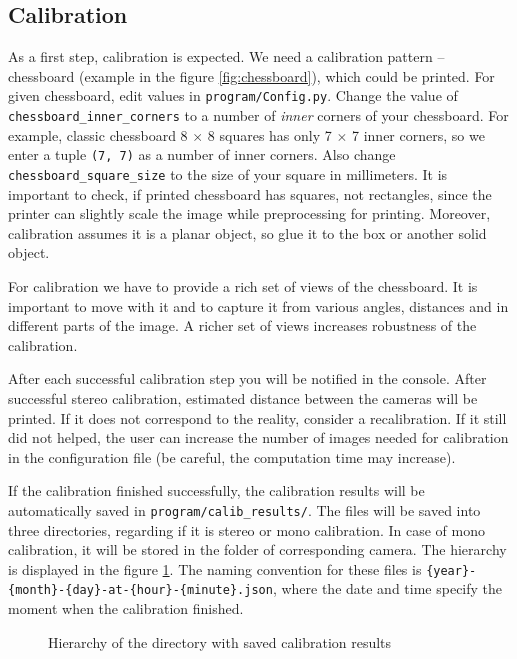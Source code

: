 \subsection{Calibration}
As a first step, calibration is expected. We need a calibration pattern --
chessboard (example in the figure \ref{fig:chessboard}), which could be
printed. For given chessboard, edit values in \verb+program/Config.py+. Change
the value of \verb+chessboard_inner_corners+ to a number of \emph{inner}
corners of your chessboard. For example, classic chessboard 8 $\times$ 8
squares has only 7 $\times$ 7 inner corners, so we enter a tuple \verb+(7, 7)+
as a number of inner corners. Also change \verb+chessboard_square_size+ to the
size of your square in millimeters. It is important to check, if printed
chessboard has squares, not rectangles, since the printer can slightly scale
the image while preprocessing for printing.  Moreover, calibration assumes it
is a planar object, so glue it to the box or another solid object.

For calibration we have to provide a rich set of views of the chessboard. It is important
to move with it and to capture it from various angles, distances and in different
parts of the image. A richer set of views increases robustness of the calibration.

After each successful calibration step you will be notified in the console.
After successful stereo calibration, estimated distance between the cameras
will be printed. If it does not correspond to the reality, consider
a recalibration. If it still did not helped, the user can increase the number of
images needed for calibration in the configuration file (be careful, the computation
time may increase).

If the calibration finished successfully, the calibration results will be
automatically saved in \verb+program/calib_results/+. The files will be saved
into three directories, regarding if it is stereo or mono calibration. In case
of mono calibration, it will be stored in the folder of corresponding camera.
The hierarchy is displayed in the figure \ref{fig:hierarchy-calib}. The naming
convention for these files is
\verb+{year}-{month}-{day}-at-{hour}-{minute}.json+, where the date and time
specify the moment when the calibration finished.

\begin{figure}
 \caption{Hierarchy of the directory with saved calibration results}
 \label{fig:hierarchy-calib}
\end{figure}

